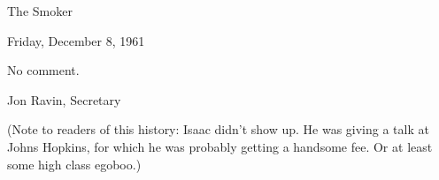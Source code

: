 \documentclass[12pt]{article}
\begin{document}
\begin{center}

The Smoker

Friday, December 8, 1961

\end{center}
 
\vspace{12pt}

\setlength{\parskip}{6pt}

\noindent
No comment.

\vspace{12pt}

\centerline{Jon Ravin, Secretary}

(Note to readers of this history: Isaac didn't show up. He was giving a talk at Johns Hopkins, for which he was probably getting a handsome fee. Or at least some high class egoboo.)
\end{document}
